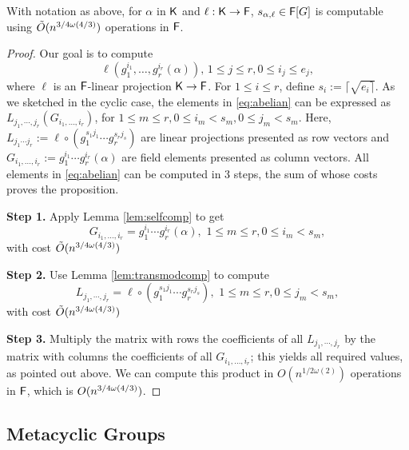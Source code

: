 \begin{proposition}
  With notation as above, for $\alpha$ in ${\mathsf{K}}$ and $\ell:{\mathsf{K}}\to{\mathsf{F}}$, 
  $s_{\alpha,\ell} \in {\mathsf{F}}[G]$ is computable using  $\tilde{O}(n^{3/4 \omega(4/3)})$
  operations in ${\mathsf{F}}$.
\end{proposition}
\begin{proof}
Our goal is to compute
\begin{equation}\label{eq:abelian}
  \ell (g_1^{i_1},  \ldots, g_r^{i_r}(\alpha)), \, 1 \leq j \leq r, 0 \leq i_j \leq e_j,
\end{equation}
where $\ell$ is an ${\mathsf{F}}$-linear projection ${\mathsf{K}}\to {\mathsf{F}}$.  For $ 1\leq i
\leq r$, define $s_i:=\lceil\sqrt{e_i \rceil}$. As we sketched in the
cyclic case, the elements in \eqref{eq:abelian} can be expressed as
$L_{j_1,\cdots, j_r} (G_{i_1,\dots,i_r})$, 
for $1\leq m \leq r, 0\leq i_m < s_m, 0 \leq j_m < s_m$.
Here, $L_{j_1\cdots j_r} :=\ell \circ (g_1^{s_1j_1} \cdots
g_r^{s_rj_s})$ are linear projections presented as row vectors and
$G_{i_1,\dots,i_r}:=g_1^{i_1} \cdots g_r^{i_r}(\alpha)$ are field
elements presented as column vectors. All elements in
\eqref{eq:abelian} can be computed in 3 steps, the sum of whose 
costs proves the proposition.

\smallskip\noindent \textbf{Step 1.} Apply Lemma \ref{lem:selfcomp} to get 
$$G_{i_1,\dots,i_r}=g_1^{i_1} \cdots g_r^{i_r}(\alpha), \,\, 1\leq m \leq r, 0\leq i_m < s_m,$$
with cost $\tilde{O}(n^{3/4 \omega(4/3)})$

\smallskip\noindent\textbf{Step 2.} Use Lemma \ref{lem:transmodcomp} to compute 
$$L_{j_1,\cdots,j_r} = \ell \circ (g_1^{s_1j_1} \cdots
g_r^{s_rj_s}), \,\, 1\leq m \leq r, 0 \leq j_m < s_m,$$
with cost $\tilde{O}(n^{3/4 \omega(4/3)})$

\smallskip\noindent\textbf{Step 3.} Multiply the matrix with rows the
coefficients of all $L_{j_1,\cdots,j_r}$ by the matrix with columns
the coefficients of all $G_{i_1,\dots,i_r}$; this yields all required
values, as pointed out above. We can compute this  product in
$O(n^{1/2\omega(2)})$ operations in ${\mathsf{F}}$, which is $O(n^{3/4 \omega(4/3)})$.
\end{proof}


\subsection{Metacyclic Groups}

